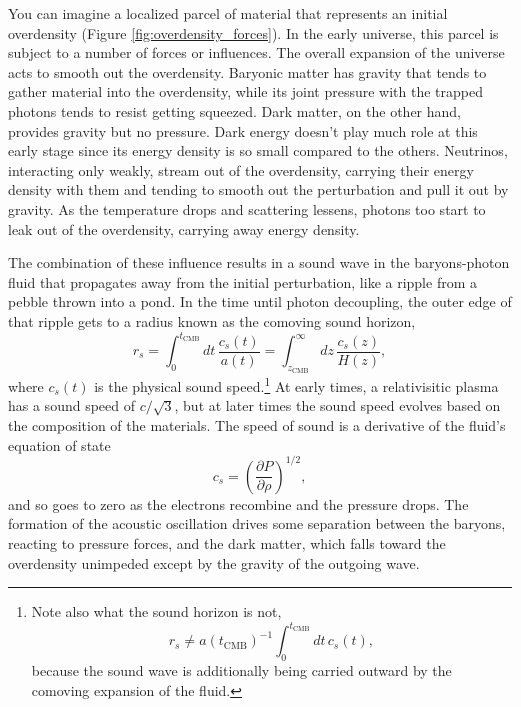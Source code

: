 You can imagine a localized parcel of material that represents an initial overdensity (Figure \ref{fig:overdensity_forces}).  In the early universe, this parcel is subject to a number of forces or influences. The overall expansion of the universe acts to smooth out the overdensity.  Baryonic matter has gravity that tends to gather material into the overdensity, while its joint pressure with the trapped photons tends to resist getting squeezed.  Dark matter, on the other hand, provides gravity but no pressure.  Dark energy doesn't play much role at this early stage since its energy density is so small compared to the others.  Neutrinos, interacting only weakly, stream out of the overdensity, carrying their energy density with them and tending to smooth out the perturbation and pull it out by gravity.  As the temperature drops and scattering lessens, photons too start to leak out of the overdensity, carrying away energy density.

The combination of these influence results in a sound wave in the baryons-photon fluid that propagates away from the initial perturbation, like a ripple from a pebble thrown into a pond.  In the time until photon decoupling, the outer edge of that ripple gets to a  radius known as the comoving sound horizon,
\begin{equation}
  r_s = \int_{0}^{t_\textrm{CMB}} dt\, \frac{c_s(t)}{a(t)} = \int_{z_\textrm{CMB}}^\infty dz\, \frac{c_s(z)}{H(z)}, \label{eq:comoving_sound_horizon}
\end{equation}
where $c_s(t)$ is the physical sound speed.\footnote{Note also what the sound horizon is not, \begin{equation} r_s \neq a(t_\textrm{CMB})^{-1}\int_{0}^{t_\textrm{CMB}} dt\, c_s(t), \end{equation} because the sound wave is additionally being carried outward by the comoving expansion of the fluid.}  At early times, a relativisitic plasma has a sound speed of $c/\sqrt{3}$, but at later times the sound speed evolves based on the composition of the materials.  The speed of sound is a derivative of the fluid's equation of state  
\begin{equation}
  c_s  = \left( \frac{\partial P}{\partial \rho}  \right)^{1/2},
\end{equation}
and so goes to zero as the electrons recombine and the pressure drops.  The formation of the acoustic oscillation drives some separation between the baryons, reacting to pressure forces, and the dark matter, which falls toward the overdensity unimpeded except by the gravity of the outgoing wave. 

